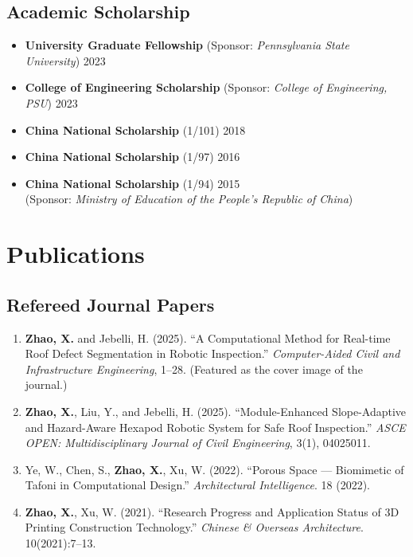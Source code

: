 \documentclass[11pt,a4paper]{article}
\newcommand{\entrytitle}[1]{\textbf{#1}}
\newcommand{\entrydetail}[1]{\textit{#1}}
\begin{document}
\subsection*{Academic Scholarship}
\begin{itemize}[nosep, leftmargin=1.5em]
    \item \entrytitle{University Graduate Fellowship} (Sponsor: \entrydetail{Pennsylvania State University}) \hfill 2023
    \item \entrytitle{College of Engineering Scholarship} (Sponsor: \entrydetail{College of Engineering, PSU}) \hfill 2023
    \item \entrytitle{China National Scholarship} (1/101) \hfill 2018
    \item \entrytitle{China National Scholarship} (1/97) \hfill 2016
    \item \entrytitle{China National Scholarship} (1/94) \hfill 2015 \\
    (Sponsor: \entrydetail{Ministry of Education of the People's Republic of China})
\end{itemize}

\section{Publications}

\subsection*{Refereed Journal Papers}
\begin{enumerate}[leftmargin=1.5em]
    \item \textbf{Zhao, X.} and Jebelli, H. (2025). ``A Computational Method for Real-time Roof Defect Segmentation in Robotic Inspection.'' \textit{Computer-Aided Civil and Infrastructure Engineering}, 1--28. (Featured as the cover image of the journal.)

    \item \textbf{Zhao, X.}, Liu, Y., and Jebelli, H. (2025). ``Module-Enhanced Slope-Adaptive and Hazard-Aware Hexapod Robotic System for Safe Roof Inspection.'' \textit{ASCE OPEN: Multidisciplinary Journal of Civil Engineering}, 3(1), 04025011.

    \item Ye, W., Chen, S., \textbf{Zhao, X.}, Xu, W. (2022). ``Porous Space --- Biomimetic of Tafoni in Computational Design.'' \textit{Architectural Intelligence}. 18 (2022).

    \item \textbf{Zhao, X.}, Xu, W. (2021). ``Research Progress and Application Status of 3D Printing Construction Technology.'' \textit{Chinese \& Overseas Architecture}. 10(2021):7--13.
\end{enumerate}
\end{document}
